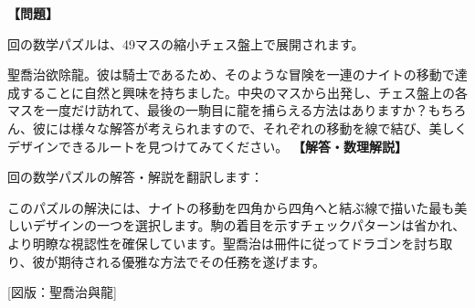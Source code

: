 \documentclass[10pt,a4paper,oneside,openany]{ltjsbook}
\begin{document}
\begin{tcolorbox}[colback=softblue,colframe=primaryblue,title=\textbf{第 334 問：ST. GEORGE AND THE DRAGON.},arc=2mm,boxrule=1pt,breakable]
\textbf{【問題】}\par\vspace{0.3em}
回の数学パズルは、49マスの縮小チェス盤上で展開されます。

聖喬治欲除龍。彼は騎士であるため、そのような冒険を一連のナイトの移動で達成することに自然と興味を持ちました。中央のマスから出発し、チェス盤上の各マスを一度だけ訪れて、最後の一駒目に龍を捕らえる方法はありますか？もちろん、彼には様々な解答が考えられますので、それぞれの移動を線で結び、美しくデザインできるルートを見つけてみてください。
\tcblower
\textbf{【解答・数理解説】}\par\vspace{0.3em}
回の数学パズルの解答・解説を翻訳します：

このパズルの解決には、ナイトの移動を四角から四角へと結ぶ線で描いた最も美しいデザインの一つを選択します。駒の着目を示すチェックパターンは省かれ、より明瞭な視認性を確保しています。聖喬治は冊件に従ってドラゴンを討ち取り、彼が期待される優雅な方法でその任務を遂げます。

[図版：聖喬治與龍]
\end{tcolorbox}
\end{document}
